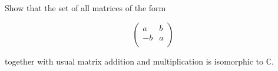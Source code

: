 Show that the set of all matrices of the form 

$$
    \left(
         \begin{array}{cc}
         a & b \\
         -b & a \\
        \end{array}
    \right)
$$

together with usual matrix addition and multiplication is isomorphic to $\mathbb{C}$.\\

\begin{solution}\renewcommand{\qedsymbol}{}\ \\

    

\end{solution}